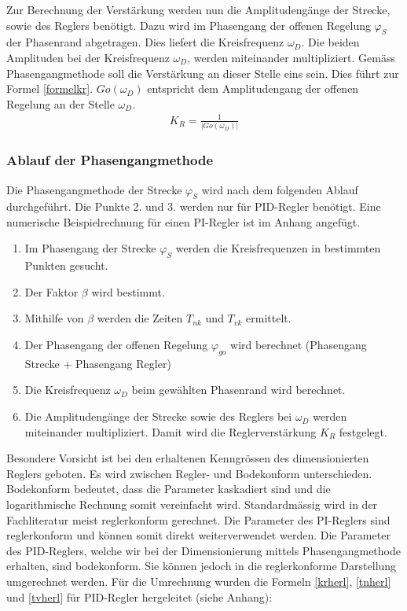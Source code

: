 Zur Berechnung der Verstärkung werden nun die Amplitudengänge der Strecke, sowie des Reglers benötigt. Dazu wird im Phasengang der offenen Regelung $\varphi_S$ der Phasenrand abgetragen. Dies liefert die Kreisfrequenz $\omega_D$. Die beiden Amplituden bei der Kreisfrequenz $\omega_D$, werden miteinander multipliziert. Gemäss Phasengangmethode soll die Verstärkung an dieser Stelle eins sein. Dies führt zur Formel \ref{formelkr}. $Go(\omega_D)$ entspricht dem Amplitudengang der offenen Regelung an der Stelle $\omega_D$. \newline
{}
\begin{align}
K_R=\frac{1}{\vert{Go(\omega_D)}\vert{}}
\label{formelkr}
\end{align}

\newpage
\subsubsection{Ablauf der Phasengangmethode}
Die Phasengangmethode der Strecke $\varphi_S$ wird nach dem folgenden Ablauf durchgeführt. Die Punkte 2. und 3. werden nur für PID-Regler benötigt. Eine numerische Beispielrechnung für einen PI-Regler ist im Anhang angefügt.
\begin{enumerate}
\item Im Phasengang der Strecke $\varphi_S$ werden die Kreisfrequenzen in bestimmten Punkten gesucht.
\item Der Faktor $\beta$ wird bestimmt.
\item Mithilfe von $\beta$ werden die Zeiten $T_{nk}$ und $T_{vk}$ ermittelt.
\item Der Phasengang der offenen Regelung $\varphi_{go}$ wird berechnet (Phasengang Strecke + Phasengang Regler)
\item Die Kreisfrequenz $\omega_D$ beim gewählten Phasenrand wird berechnet.
\item Die Amplitudengänge der Strecke sowie des Reglers bei $\omega_D$ werden miteinander multipliziert. Damit wird die Reglerverstärkung $K_R$ festgelegt. 
\end{enumerate}

Besondere Vorsicht ist bei den erhaltenen Kenngrössen des dimensionierten Reglers geboten. Es wird zwischen Regler- und Bodekonform unterschieden. Bodekonform bedeutet, dass die Parameter kaskadiert sind und die logarithmische Rechnung somit vereinfacht wird. Standardmässig wird in der Fachliteratur meist reglerkonform gerechnet. Die Parameter des PI-Reglers sind reglerkonform und können somit direkt weiterverwendet werden. Die Parameter des PID-Reglers, welche wir bei der Dimensionierung mittels Phasengangmethode erhalten, sind bodekonform. Sie können jedoch in die reglerkonforme Darstellung umgerechnet werden. Für die Umrechnung wurden die Formeln \ref{krherl}, \ref{tnherl} und \ref{tvherl} für PID-Regler hergeleitet (siehe Anhang): \newline
{}

